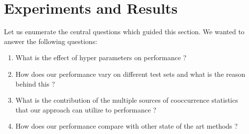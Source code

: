 \documentclass[11pt]{article}
\begin{document}
\section{Experiments and Results}
\label{sec:exp}
Let us enumerate the central questions which guided this section. We
wanted to answer the following questions:
\begin{enumerate}
\item What is the effect of hyper parameters on performance ?
\item How does our performance vary on different test sets and what is
  the reason behind this ?
\item What is the contribution of the multiple sources of cooccurrence
  statistics that our approach can utilize to performance ?
\item How does our performance compare with other state of the art
  methods ?
\end{enumerate}
\end{document}
